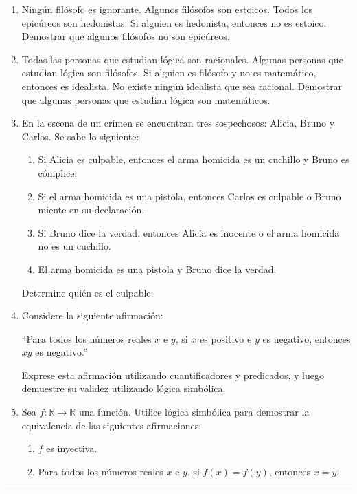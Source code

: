 \begin{enumerate}[label=\textbf{\arabic*}.]
	\item Ningún filósofo es ignorante. Algunos filósofos son estoicos. Todos los epicúreos son hedonistas. Si alguien es hedonista, entonces no es estoico. Demostrar que algunos filósofos no son epicúreos.
	
	\item Todas las personas que estudian lógica son racionales. Algunas personas que estudian lógica son filósofos. Si alguien es filósofo y no es matemático, entonces es idealista. No existe ningún idealista que sea racional. Demostrar que algunas personas que estudian lógica son matemáticos.
	
	\item En la escena de un crimen se encuentran tres sospechosos: Alicia, Bruno y Carlos. Se sabe lo siguiente:
	\begin{enumerate}
		\item Si Alicia es culpable, entonces el arma homicida es un cuchillo y Bruno es cómplice.
		\item Si el arma homicida es una pistola, entonces Carlos es culpable o Bruno miente en su declaración.
		\item Si Bruno dice la verdad, entonces Alicia es inocente o el arma homicida no es un cuchillo.
		\item El arma homicida es una pistola y Bruno dice la verdad.
	\end{enumerate}
	Determine quién es el culpable.
	
	
	\item Considere la siguiente afirmación:
	
	``Para todos los números reales $x$ e $y$, si $x$ es positivo e $y$ es negativo, entonces $xy$ es negativo.''
	
	Exprese esta afirmación utilizando cuantificadores y predicados, y luego demuestre su validez utilizando lógica simbólica.
	
	\item Sea $f: \mathbb{R} \rightarrow \mathbb{R}$ una función. Utilice lógica simbólica para demostrar la equivalencia de las siguientes afirmaciones:
	\begin{enumerate}[itemsep=-3pt]
		\item $f$ es inyectiva.
		\item Para todos los números reales $x$ e $y$, si $f(x) = f(y)$, entonces $x = y$.
	\end{enumerate}
\end{enumerate}

\rule{\textwidth}{.5pt}


